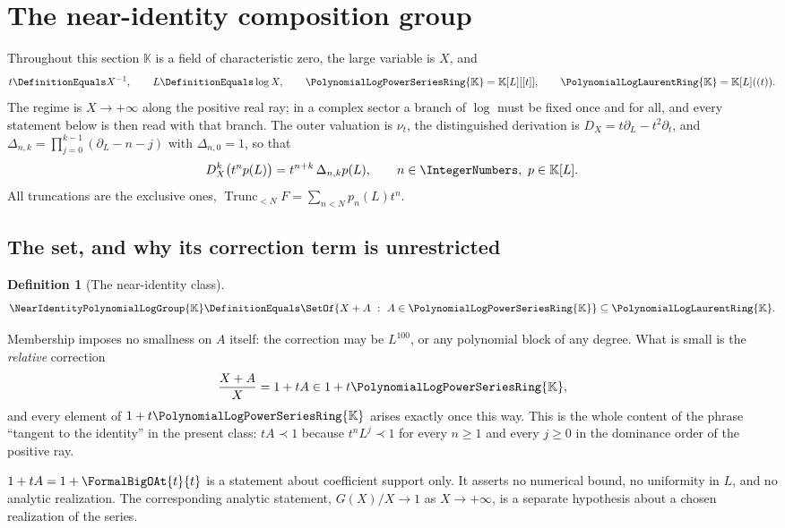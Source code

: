 \documentclass[11pt,oneside]{article}
\theoremstyle{plain}
\theoremstyle{definition}
\newtheorem{definition}[theorem]{Definition}
\theoremstyle{remark}
\newcommand{\K}{\mathbb{K}}
\newcommand{\PLpow}{\PolynomialLogPowerSeriesRing{\K}}   %
\newcommand{\PLlau}{\PolynomialLogLaurentRing{\K}}       %
\newcommand{\Gnear}{\NearIdentityPolynomialLogGroup{\K}} %
\newcommand{\ordt}{\nu_{t}}                              %
\newcommand{\Trunc}[2]{\operatorname{Trunc}_{<#2}#1}     %
\newcommand{\DX}{D_{X}}                                  %
\newcommand{\shiftop}[2]{\Delta_{#1,#2}}                 %
\newcommand{\precdom}{\prec}
\begin{document}
\section{The near-identity composition group}
\label{plt:sec:near-identity-group}

Throughout this section \(\K\) is a field of characteristic zero, the large
variable is \(X\), and
\[
  t\DefinitionEquals X^{-1},
  \qquad
  L\DefinitionEquals\log X,
  \qquad
  \PLpow=\K[L][[t]],
  \qquad
  \PLlau=\K[L]((t)).
\]
The regime is \(X\to+\infty\) along the positive real ray; in a complex sector a
branch of \(\log\) must be fixed once and for all, and every statement below is
then read with that branch.  The outer valuation is \(\ordt\), the
distinguished derivation is \(\DX=t\partial_L-t^2\partial_t\), and
\(\shiftop{n}{k}=\prod_{j=0}^{k-1}(\partial_L-n-j)\) with
\(\shiftop{n}{0}=1\), so that
\begin{equation}\label{plt:eq:grp-block-derivative}
  \DX^k\bigl(t^np(L)\bigr)=t^{n+k}\,\shiftop{n}{k}p(L),
  \qquad n\in\IntegerNumbers,\ p\in\K[L].
\end{equation}
All truncations are the exclusive ones, \(\Trunc{F}{N}=\sum_{n<N}p_n(L)t^n\).

\subsection{The set, and why its correction term is unrestricted}

\begin{definition}[The near-identity class]\label{plt:def:grp-gnear}
\[
  \Gnear\DefinitionEquals\SetOf{X+A\ :\ A\in\PLpow}\subseteq\PLlau .
\]
\end{definition}

Membership imposes no smallness on \(A\) itself: the correction may be
\(L^{100}\), or any polynomial block of any degree.  What is small is the
\emph{relative} correction
\begin{equation}\label{plt:eq:grp-relative}
  \frac{X+A}{X}=1+tA\in1+t\PLpow,
\end{equation}
and every element of \(1+t\PLpow\) arises exactly once this way.  This is the
whole content of the phrase ``tangent to the identity'' in the present class:
\(tA\precdom1\) because \(t^nL^j\precdom1\) for every \(n\ge1\) and every
\(j\ge0\) in the dominance order of the positive ray.

\begin{warningbox}
\(1+tA=1+\FormalBigOAt{t}{t}\) is a statement about coefficient support only.
It asserts no numerical bound, no uniformity in \(L\), and no analytic
realization.  The corresponding analytic statement, \(G(X)/X\to1\) as
\(X\to+\infty\), is a separate hypothesis about a chosen realization of the
series.
\end{warningbox}
\end{document}
